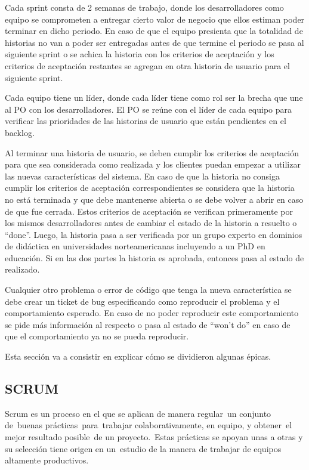 Cada sprint consta de 2 semanas de trabajo, donde los desarrolladores como equipo se comprometen a entregar cierto valor de negocio que ellos estiman poder terminar en dicho periodo. En caso de que el equipo presienta que la totalidad de historias no van a poder ser entregadas antes de que termine el periodo se pasa al siguiente sprint o se achica la historia con los criterios de aceptación y los criterios de aceptación restantes se agregan en otra historia de usuario para el siguiente sprint.

Cada equipo tiene un líder, donde cada líder tiene como rol ser la brecha que une al PO con los desarrolladores. El PO se reúne con el líder de cada equipo para verificar las prioridades de las historias de usuario que están pendientes en el backlog. 

Al terminar una historia de usuario, se deben cumplir los criterios de aceptación para que sea considerada como realizada y los clientes puedan empezar a utilizar las nuevas características del sistema. En caso de que la historia no consiga cumplir los criterios de aceptación correspondientes se considera que la historia no está terminada y que debe mantenerse abierta o se debe volver a abrir en caso de que fue cerrada. Estos criterios de aceptación se verifican primeramente por los mismos desarrolladores antes de cambiar el estado de la historia a resuelto o “done”. Luego, la historia pasa a ser verificada por un grupo experto en dominios de didáctica en universidades norteamericanas incluyendo a un PhD en educación. Si en las dos partes la historia es aprobada, entonces pasa al estado de realizado. 

Cualquier otro problema o error de código que tenga la nueva característica se debe crear un ticket de bug especificando como reproducir el problema y el comportamiento esperado. En caso de no poder reproducir este comportamiento se pide más información al respecto o pasa al estado de “won’t do” en caso de que el comportamiento ya no se pueda reproducir.

Esta sección va a consistir en explicar cómo se dividieron algunas épicas.


\subsection{SCRUM}
Scrum es un proceso en el que se aplican de manera regular un conjunto de buenas prácticas para trabajar colaborativamente, en equipo, y obtener el mejor resultado posible de un proyecto. Estas prácticas se apoyan unas a otras y su selección tiene origen en un estudio de la manera de trabajar de equipos altamente productivos.

